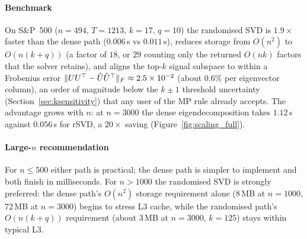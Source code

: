 \paragraph{Benchmark}
On S\&P~500 ($n=494$, $T=1213$, $k=17$, $q=10$) the randomised SVD is $1.9\times$
faster than the dense path ($0.006$\,s vs $0.011$\,s), reduces storage from
$O(n^2)$ to $O(n(k+q))$ (a factor of $18$, or $29$ counting only the returned
$O(nk)$ factors that the solver retains), and aligns the top-$k$ signal subspace
to within a Frobenius error
$\lVert UU^\top - \hat{U}\hat{U}^\top \rVert_F \approx 2.5 \times 10^{-2}$ (about $0.6\%$
per eigenvector column), an order of magnitude below the $k \pm 1$ threshold
uncertainty (Section~\ref{sec:ksensitivity}) that any user of the MP rule already
accepts. The advantage grows with $n$: at $n=3000$ the dense eigendecomposition
takes $1.12$\,s against $0.056$\,s for rSVD, a $20\times$ saving
(Figure~\ref{fig:scaling_full}).

\paragraph{Large-\texorpdfstring{$n$}{n} recommendation}
For $n \leq 500$ either path is practical; the dense path is simpler to implement
and both finish in milliseconds. For $n > 1000$ the randomised SVD is strongly
preferred: the dense path's $O(n^2)$ storage requirement alone (8\,MB at $n=1000$,
72\,MB at $n=3000$) begins to stress L3 cache, while the randomised path's
$O(n(k+q))$ requirement (about $3$\,MB at $n=3000$, $k=125$) stays within
typical L3.
